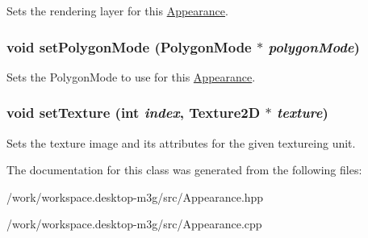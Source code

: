 Sets the rendering layer for this \hyperlink{classm3g_1_1Appearance}{Appearance}. \hypertarget{classm3g_1_1Appearance_cc21fac7868e2ad37e689ac642db1aae}{
\subsubsection[{setPolygonMode}]{\setlength{\rightskip}{0pt plus 5cm}void setPolygonMode (PolygonMode $\ast$ {\em polygonMode})}}
\label{classm3g_1_1Appearance_cc21fac7868e2ad37e689ac642db1aae}


Sets the PolygonMode to use for this \hyperlink{classm3g_1_1Appearance}{Appearance}. \hypertarget{classm3g_1_1Appearance_493e54b1c7ab839b9e76b28e0629cf6a}{
\subsubsection[{setTexture}]{\setlength{\rightskip}{0pt plus 5cm}void setTexture (int {\em index}, \/  {\bf Texture2D} $\ast$ {\em texture})}}
\label{classm3g_1_1Appearance_493e54b1c7ab839b9e76b28e0629cf6a}


Sets the texture image and its attributes for the given textureing unit. 

The documentation for this class was generated from the following files:\begin{CompactItemize}
\item 
/work/workspace.desktop-m3g/src/Appearance.hpp\item 
/work/workspace.desktop-m3g/src/Appearance.cpp\end{CompactItemize}
